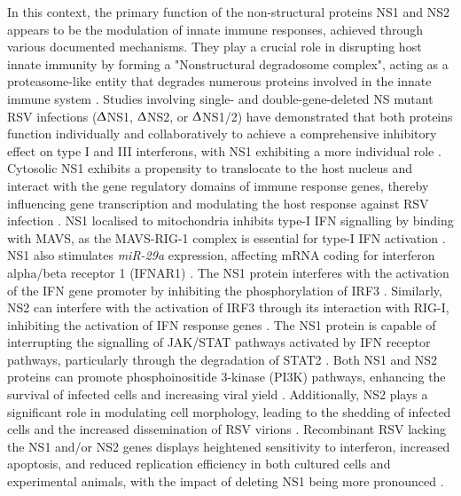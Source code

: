 In this context, the primary function of the non-structural proteins NS1 and NS2 appears to be the modulation of innate immune responses, achieved through various documented mechanisms. They play a crucial role in disrupting host innate immunity by forming a "Nonstructural degradosome complex", acting as a proteasome-like entity that degrades numerous proteins involved in the innate immune system \cite{Boyoglu-Barnum2019BiologyDevelopment.}. Studies involving single- and double-gene-deleted NS mutant RSV infections ($\Updelta$NS1, $\Updelta$NS2, or $\Updelta$NS1/2) have demonstrated that both proteins function individually and collaboratively to achieve a comprehensive inhibitory effect on type I and III interferons, with NS1 exhibiting a more individual role \cite{Sedeyn2019RespiratoryResponses, Spann2004SuppressionMacrophages}. Cytosolic NS1 exhibits a propensity to translocate to the host nucleus and interact with the gene regulatory domains of immune response genes, thereby influencing gene transcription and modulating the host response against RSV infection \cite{Pei2021Nuclear-localizedTranscription}. NS1 localised to mitochondria inhibits type-I IFN signalling by binding with MAVS, as the MAVS-RIG-1 complex is essential for type-I IFN activation \cite{Boyapalle2012RespiratoryInfection}. NS1 also stimulates \textit{miR-29a} expression, affecting mRNA coding for interferon alpha/beta receptor 1 (IFNAR1) \cite{Sedeyn2019RespiratoryResponses, Zhang2016RespiratoryReceptor}. The NS1 protein interferes with the activation of the IFN gene promoter by inhibiting the phosphorylation of IRF3 \cite{Spann2005EffectsCytokines}. Similarly, NS2 can interfere with the activation of IRF3 through its interaction with RIG-I, inhibiting the activation of IFN response genes \cite{Wright2006TheHumans}. The NS1 protein is capable of interrupting the signalling of JAK/STAT pathways activated by IFN receptor pathways, particularly through the degradation of STAT2 \cite{Wright2006TheHumans, Sedeyn2019RespiratoryResponses}. Both NS1 and NS2 proteins can promote phosphoinositide 3-kinase (PI3K) pathways, enhancing the survival of infected cells and increasing viral yield \cite{Wu2012TheBiology.}. Additionally, NS2 plays a significant role in modulating cell morphology, leading to the shedding of infected cells and the increased dissemination of RSV virions \cite{Sedeyn2019RespiratoryResponses, Liesman2014RSV-encodedObstruction}. Recombinant RSV lacking the NS1 and/or NS2 genes displays heightened sensitivity to interferon, increased apoptosis, and reduced replication efficiency in both cultured cells and experimental animals, with the impact of deleting NS1 being more pronounced \cite{Whitehead1999RecombinantChimpanzees, Teng2000RecombinantChimpanzees}.

